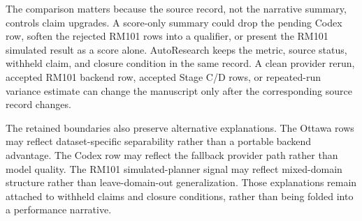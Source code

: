 \documentclass[11pt]{article}
\begin{document}
\begin{table}[t]
\centering
\small
{}
\caption{Claim-boundary synthesis. Each empirical stream states the source-status decision, the stronger claim still withheld, and the evidence needed before that claim could be made.}
\label{tab:evidence-claim-synthesis}
\end{table}

The comparison matters because the source record, not the narrative summary, controls claim upgrades. A score-only summary could drop the pending Codex row, soften the rejected RM101 rows into a qualifier, or present the RM101 simulated result as a score alone. AutoResearch keeps the metric, source status, withheld claim, and closure condition in the same record. A clean provider rerun, accepted RM101 backend row, accepted Stage C/D rows, or repeated-run variance estimate can change the manuscript only after the corresponding source record changes.

The retained boundaries also preserve alternative explanations. The Ottawa rows may reflect dataset-specific separability rather than a portable backend advantage. The Codex row may reflect the fallback provider path rather than model quality. The RM101 simulated-planner signal may reflect mixed-domain structure rather than leave-domain-out generalization. Those explanations remain attached to withheld claims and closure conditions, rather than being folded into a performance narrative.
\end{document}
